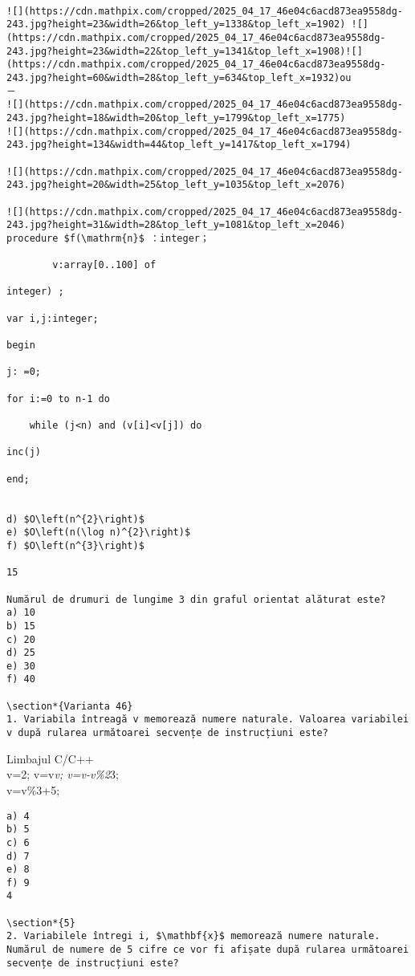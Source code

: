 \begin{verbatim}
    
![](https://cdn.mathpix.com/cropped/2025_04_17_46e04c6acd873ea9558dg-243.jpg?height=23&width=26&top_left_y=1338&top_left_x=1902) ![](https://cdn.mathpix.com/cropped/2025_04_17_46e04c6acd873ea9558dg-243.jpg?height=23&width=22&top_left_y=1341&top_left_x=1908)![](https://cdn.mathpix.com/cropped/2025_04_17_46e04c6acd873ea9558dg-243.jpg?height=60&width=28&top_left_y=634&top_left_x=1932)ou
－
![](https://cdn.mathpix.com/cropped/2025_04_17_46e04c6acd873ea9558dg-243.jpg?height=18&width=20&top_left_y=1799&top_left_x=1775)
![](https://cdn.mathpix.com/cropped/2025_04_17_46e04c6acd873ea9558dg-243.jpg?height=134&width=44&top_left_y=1417&top_left_x=1794)

![](https://cdn.mathpix.com/cropped/2025_04_17_46e04c6acd873ea9558dg-243.jpg?height=20&width=25&top_left_y=1035&top_left_x=2076)

![](https://cdn.mathpix.com/cropped/2025_04_17_46e04c6acd873ea9558dg-243.jpg?height=31&width=28&top_left_y=1081&top_left_x=2046)
procedure $f(\mathrm{n}$ ：integer；

        v:array[0..100] of

integer) ;

var i,j:integer;

begin

j: =0;

for i:=0 to n-1 do

    while (j<n) and (v[i]<v[j]) do

inc(j)

end;


d) $O\left(n^{2}\right)$
e) $O\left(n(\log n)^{2}\right)$
f) $O\left(n^{3}\right)$

15

Numărul de drumuri de lungime 3 din graful orientat alăturat este?
a) 10
b) 15
c) 20
d) 25
e) 30
f) 40

\section*{Varianta 46}
1. Variabila întreagă v memorează numere naturale. Valoarea variabilei v după rularea următoarei secvențe de instrucțiuni este?
\end{verbatim}

Limbajul C/C++\\
v=2; v=v\textit{v; v=v-v\%2}3;\\
v=v\%3+5;

\begin{verbatim}
a) 4
b) 5
c) 6
d) 7
e) 8
f) 9
4

\section*{5}
2. Variabilele întregi i, $\mathbf{x}$ memorează numere naturale. Numărul de numere de 5 cifre ce vor fi afișate după rularea următoarei secvențe de instrucțiuni este?
\end{verbatim}

